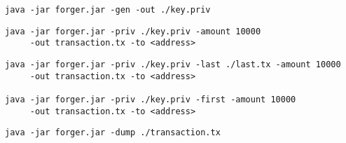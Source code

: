 \documentclass[../documentation.tex]{subfiles}
\begin{document}
\begin{lstlisting}[style=generic]
java -jar forger.jar -gen -out ./key.priv
\end{lstlisting}

\begin{lstlisting}[style=generic]
java -jar forger.jar -priv ./key.priv -amount 10000
     -out transaction.tx -to <address>
\end{lstlisting}

\begin{lstlisting}[style=generic]
java -jar forger.jar -priv ./key.priv -last ./last.tx -amount 10000
     -out transaction.tx -to <address>

java -jar forger.jar -priv ./key.priv -first -amount 10000
     -out transaction.tx -to <address>
\end{lstlisting}

\begin{lstlisting}[style=generic]
java -jar forger.jar -dump ./transaction.tx
\end{lstlisting}
\end{document}
